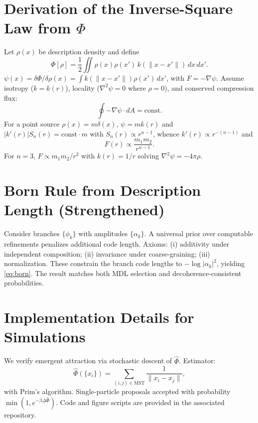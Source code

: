 \documentclass[aps,preprint,onecolumn,longbibliography,nofootinbib]{revtex4-2}
\numberwithin{equation}{section}        %
\begin{document}
\appendix

\section{Derivation of the Inverse-Square Law from $\Phi$}\label{app:A}
Let $\rho(x)$ be description density and define
\begin{equation}
\Phi[\rho] = \frac{1}{2}\iint \rho(x)\rho(x')\,k(\|x-x'\|)\,dx\,dx'. \label{eq:A1}
\end{equation}
$\psi(x)=\delta\Phi/\delta\rho(x)=\int k(\|x-x'\|)\rho(x')\,dx'$, with $F=-\nabla\psi$. Assume isotropy ($k=k(r)$), locality ($\nabla^2\psi=0$ where $\rho=0$), and conserved compression flux:
\begin{equation}
\oint -\nabla\psi \cdot dA = \text{const}. \label{eq:Aflux}
\end{equation}
For a point source $\rho(x)=m\delta(x)$, $\psi=mk(r)$ and $|k'(r)|S_n(r)=\text{const}\cdot m$ with $S_n(r)\propto r^{n-1}$, whence $k'(r)\propto r^{-(n-1)}$ and
\begin{equation}
F(r) \propto \frac{m_1 m_2}{r^{n-1}}. \label{eq:An}
\end{equation}
For $n=3$, $F\propto m_1m_2/r^2$ with $k(r)=1/r$ solving $\nabla^2\psi=-4\pi\rho$.

\section{Born Rule from Description Length (Strengthened)}\label{app:B}
Consider branches $\{\phi_k\}$ with amplitudes $\{\alpha_k\}$. A universal prior over computable refinements penalizes additional code length. Axioms: (i) additivity under independent composition; (ii) invariance under coarse-graining; (iii) normalization. These constrain the branch code lengths to $-\log|\alpha_k|^2$, yielding \eqref{eq:born}. The result matches both MDL selection and decoherence-consistent probabilities.

\section{Implementation Details for Simulations}\label{app:D}
We verify emergent attraction via stochastic descent of $\widehat{\Phi}$. Estimator:
\begin{equation}
\widehat{\Phi}(\{x_i\}) = \sum_{(i,j)\in \mathrm{MST}} \frac{1}{\|x_i - x_j\|}, \label{eq:D1}
\end{equation}
with Prim’s algorithm. Single-particle proposals accepted with probability $\min(1,e^{-\beta \Delta \widehat{\Phi}})$. Code and figure scripts are provided in the associated repository.
\end{document}

